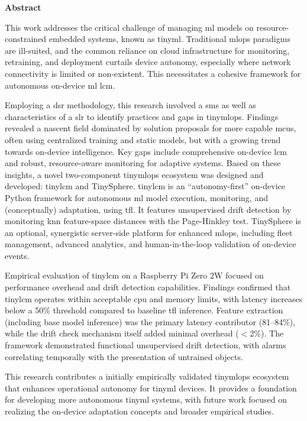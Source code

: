 

\clearemptydoublepage
{}


\vspace*{2cm}
{\Large \bf Abstract}
\vspace{1cm}

This work addresses the critical challenge of managing \gls{ml} models on resource-constrained embedded systems, known as \gls{tinyml}. Traditional \gls{mlops} paradigms are ill-suited, and the common reliance on cloud infrastructure for monitoring, retraining, and deployment curtails device autonomy, especially where network connectivity is limited or non-existent. This necessitates a cohesive framework for autonomous on-device \gls{ml} \gls{lcm}. 

Employing a \gls{dsr} methodology, this research involved a \gls{sms} as well as characteristics of a \gls{slr} to identify practices and gaps in \gls{tinymlops}. Findings revealed a nascent field dominated by solution proposals for more capable \glspl{mcu}, often using centralized training and static models, but with a growing trend towards on-device intelligence. Key gaps include comprehensive on-device \gls{lcm} and robust, resource-aware monitoring for adaptive systems.
Based on these insights, a novel two-component \gls{tinymlops} ecosystem was designed and developed: \gls{tinylcm} and TinySphere. \gls{tinylcm} is an ``autonomy-first'' on-device Python framework for autonomous \gls{ml} model execution, monitoring, and (conceptually) adaptation, using \gls{tfl}. It features unsupervised drift detection by monitoring \gls{knn} feature-space distances with the Page-Hinkley test. TinySphere is an optional, synergistic server-side platform for enhanced \gls{mlops}, including fleet management, advanced analytics, and human-in-the-loop validation of on-device events.

Empirical evaluation of \gls{tinylcm} on a Raspberry Pi Zero 2W focused on performance overhead and drift detection capabilities. Findings confirmed that \gls{tinylcm} operates within acceptable \gls{cpu} and memory limits, with latency increases below a 50\% threshold compared to baseline \gls{tfl} inference. Feature extraction (including base model inference) was the primary latency contributor (81--84\%), while the drift check mechanism itself added minimal overhead ($<$2\%). The framework demonstrated functional unsupervised drift detection, with alarms correlating temporally with the presentation of untrained objects.

This research contributes a initially empirically validated \gls{tinymlops} ecosystem that enhances operational autonomy for \gls{tinyml} devices. It provides a foundation for developing more autonomous \gls{tinyml} systems, with future work focused on realizing the on-device adaptation concepts and broader empirical studies.